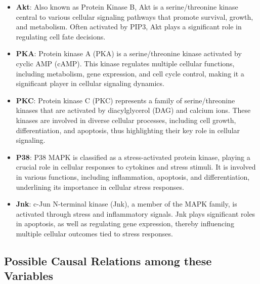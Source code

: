 \documentclass{article}
\begin{document}
\begin{itemize}
    \item \textbf{Akt}: Also known as Protein Kinase B, Akt is a serine/threonine kinase central to various cellular signaling pathways that promote survival, growth, and metabolism. Often activated by PIP3, Akt plays a significant role in regulating cell fate decisions.
    
    \item \textbf{PKA}: Protein kinase A (PKA) is a serine/threonine kinase activated by cyclic AMP (cAMP). This kinase regulates multiple cellular functions, including metabolism, gene expression, and cell cycle control, making it a significant player in cellular signaling dynamics.
    
    \item \textbf{PKC}: Protein kinase C (PKC) represents a family of serine/threonine kinases that are activated by diacylglycerol (DAG) and calcium ions. These kinases are involved in diverse cellular processes, including cell growth, differentiation, and apoptosis, thus highlighting their key role in cellular signaling.
    
    \item \textbf{P38}: P38 MAPK is classified as a stress-activated protein kinase, playing a crucial role in cellular responses to cytokines and stress stimuli. It is involved in various functions, including inflammation, apoptosis, and differentiation, underlining its importance in cellular stress responses.
    
    \item \textbf{Jnk}: c-Jun N-terminal kinase (Jnk), a member of the MAPK family, is activated through stress and inflammatory signals. Jnk plays significant roles in apoptosis, as well as regulating gene expression, thereby influencing multiple cellular outcomes tied to stress responses.
\end{itemize}

\subsection{Possible Causal Relations among these Variables}
\end{document}
